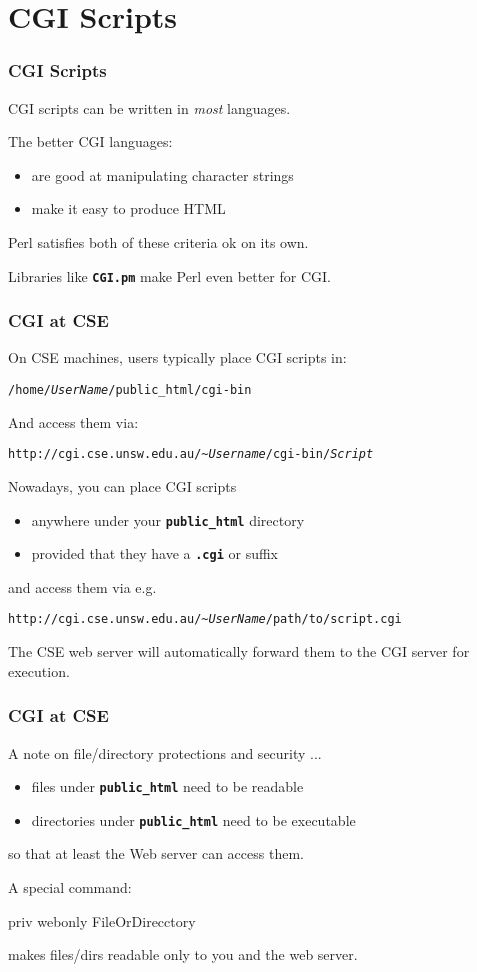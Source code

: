 

\section{CGI Scripts}

\begin{frame}
\frametitle{CGI Scripts}
CGI scripts can be written in {\em{most}} languages.

The better CGI languages:
\begin{itemize}
\item  are good at manipulating character strings
\item  make it easy to produce HTML
\end{itemize}
Perl satisfies both of these criteria ok on its own.

Libraries like \textbf{\tt{CGI.pm}} make Perl even better for CGI.
\end{frame}

\begin{frame}[fragile]
\frametitle{CGI at CSE}
On CSE machines, users typically place CGI scripts in:

{\tt /home/{\it{UserName}}/public\_html/cgi-bin}

And access them via:

{\tt http://cgi.cse.unsw.edu.au/\textasciitilde{\it{Username}}/cgi-bin/{\it{Script}}}

Nowadays, you can place CGI scripts
\begin{itemize}
\item  anywhere under your \textbf{\tt{public\_html}} directory
\item  provided that they have a \textbf{\tt{.cgi}} or suffix
\end{itemize}
and access them via e.g.

    {\tt http://cgi.cse.unsw.edu.au/\textasciitilde{\it{UserName}}/path/to/script.cgi}

The CSE web server will automatically forward them to
the CGI server for execution.
\end{frame}

\begin{frame}[fragile]
\frametitle{CGI at CSE}
A note on file/directory protections and security ...
\begin{itemize}
\item  files under \textbf{\tt{public\_html}} need to be readable
\item  directories under \textbf{\tt{public\_html}} need to be executable
\end{itemize}
so that at least the Web server can access them.

A special command:
\begin{perl}
    priv webonly FileOrDirecctory
\end{perl}

makes files/dirs readable only to you and the web server.
\end{frame}

